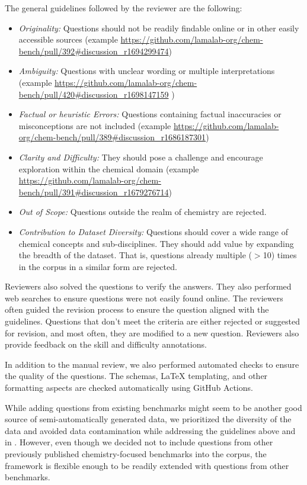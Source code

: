 The general guidelines followed by the reviewer are the following:

\begin{itemize}
    \item \textit{Originality:} Questions should not be readily findable online or in other easily accessible sources (example \url{https://github.com/lamalab-org/chem-bench/pull/392#discussion_r1694299474})
    \item \textit{Ambiguity:} Questions with unclear wording or multiple interpretations (example \url{https://github.com/lamalab-org/chem-bench/pull/420#discussion_r1698147159} )
    \item \textit{Factual or heuristic Errors: }Questions containing factual inaccuracies or misconceptions are not included (example \url{https://github.com/lamalab-org/chem-bench/pull/389#discussion_r1686187301})
    \item \textit{Clarity and Difficulty: } They should pose a challenge and encourage exploration within the chemical domain (example \url{https://github.com/lamalab-org/chem-bench/pull/391#discussion_r1679276714})
    \item \textit{Out of Scope:} Questions outside the realm of chemistry are rejected.
    \item \textit{Contribution to Dataset Diversity: }Questions should cover a wide range of chemical concepts and sub-disciplines. They should add value by expanding the breadth of the dataset. That is, questions already multiple ($>$10) times in the corpus in a similar form are rejected.
\end{itemize}

Reviewers also solved the questions to verify the answers. They also performed web searches to ensure questions were not easily found online. The reviewers often guided the revision process to ensure the question aligned with the guidelines. Questions that don't meet the criteria are either rejected or suggested for revision, and most often, they are modified to a new question. Reviewers also provide feedback on the skill and difficulty annotations.

In addition to the manual review, we also performed automated checks to ensure the quality of the questions. The schemas, \LaTeX\xspace templating, and other formatting aspects are checked automatically using GitHub Actions.

While adding questions from existing benchmarks might seem to be another good source of semi-automatically generated data, we prioritized the diversity of the data and avoided data contamination while addressing the guidelines above and in .
However, even though we decided not to include questions from other previously published chemistry-focused benchmarks into the \chembench corpus, the framework is flexible enough to be readily extended with questions from other benchmarks.

